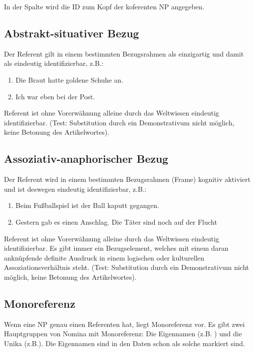{\noindent 
{} In der Spalte  wird die ID zum Kopf der koferenten NP angegeben.

\subsection{Abstrakt-situativer Bezug}

Der Referent gilt in einem bestimmten Bezugsrahmen als einzigartig und damit als eindeutig identifizierbar, z.B.:

\begin{enumerate}
\item Die Braut hatte goldene Schuhe an.
\item Ich war eben bei der Post.  
\end{enumerate}

\noindent 
{} Referent ist ohne Vorerwähnung alleine durch das Weltwissen eindeutig identifizierbar. (Test: Substitution durch ein Demonstrativum nicht möglich, keine Betonung des Artikelwortes). 

\subsection{Assoziativ-anaphorischer Bezug}

Der Referent wird in einem bestimmten Bezugsrahmen (Frame) kognitiv aktiviert und ist deswegen eindeutig identifizierbar, z.B.:

\begin{enumerate}
\item Beim Fußballspiel ist der Ball kaputt gegangen. 
\item Gestern gab es einen Anschlag. Die Täter sind noch auf der Flucht
\end{enumerate}

\noindent 
{} Referent ist ohne Vorerwähnung alleine durch das Weltwissen eindeutig identifizierbar. Es gibt immer ein Bezugselement, welches mit einem daran anknüpfende definite Ausdruck in einem logischen oder kulturellen Assoziationsverhältnis steht. (Test: Substitution durch ein Demonstrativum nicht möglich, keine Betonung des Artikelwortes). 

\subsection{Monoreferenz}

Wenn eine NP genau einen Referenten hat, liegt Monoreferenz vor. Es gibt zwei Hauptgruppen von Nomina mit Monoreferenz: Die Eigennamen (z.B. ) und die Unika (z.B.). Die Eigennamen sind in den Daten schon als solche markiert sind. 

}
